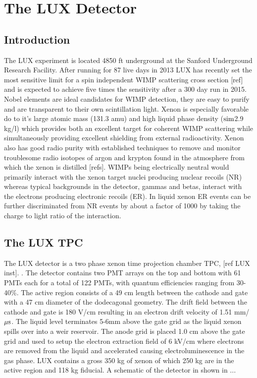 

\renewcommand{\thechapter}{2}

\chapter{The LUX Detector}

\section{Introduction}

The LUX experiment is located 4850 ft underground at the Sanford Underground Research Facility. After running for 87 live days in 2013 LUX has recently set the most sensitive limit for a spin independent WIMP scattering cross section [ref] and is expected to achieve five times the sensitivity after a 300 day run in 2015. Nobel elements are ideal candidates for WIMP detection, they are easy to purify and are transparent to their own scintillation light. Xenon is especially favorable do to it's  large atomic mass (131.3 amu) and high liquid phase density ($\rm sim$2.9 kg/l) which provides both an excellent target for coherent WIMP scattering while simultaneously providing excellent shielding from external radioactivity. Xenon also has good radio purity with established techniques to remove and monitor troublesome radio isotopes of argon and krypton found in the atmosphere from which the xenon is distilled [refs]. 
WIMPs being electrically neutral would primarily interact with the xenon target nuclei producing nuclear recoils (NR) whereas typical backgrounds in the detector, gammas and betas, interact with the electrons producing electronic recoils (ER). In liquid xenon ER events can be further discriminated from NR events by about a factor of 1000 by taking the charge to light ratio of the interaction.



\section{The LUX TPC}

The LUX detector is a two phase xenon time projection chamber TPC,  [ref LUX inst]. . The detector contains two PMT arrays on the top and bottom with 61 PMTs each for a total of 122 PMTs, with quantum efficiencies ranging from 30-40\%. The active region consists of a 49 cm length between the cathode and gate with a 47 cm diameter of the dodecagonal geometry. The drift field between the cathode and gate is 180 V/cm resulting in an electron drift velocity of 1.51 mm/$\rm \mu s$. The liquid level terminates 5-6mm above the gate grid as the liquid xenon spills over into a weir reservoir. The anode grid is placed 1.0 cm above the gate grid and used to setup the electron extraction field of 6 kV/cm where electrons are removed from the liquid and accelerated causing electroluminescence in the gas phase.  LUX contains a gross 350 kg of xenon of which 250 kg are in the active region and 118 kg fiducial. A schematic of the detector in shown in ...

